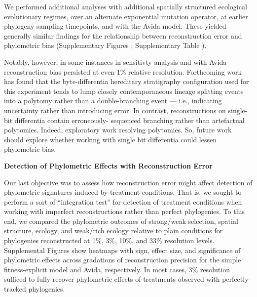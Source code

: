 We performed additional analyses with additional spatially structured ecological evolutionary regimes, over an alternate exponential mutation operator, at earlier phylogeny sampling timepoints, and with the Avida model.
These yielded generally similar findings for the relationship between reconstruction error and phylometric bias (Supplementary Figures ; Supplementary Table ).

Notably, however, in some instances in sensitivty analysis and with Avida reconstruction bias persisted at even 1\% relative resolution.
Forthcoming work has found that the byte-differentia  hereditary stratigraphy configuration used for this experiment tends to lump closely contemporaneous lineage splitting events into a polytomy rather than a double-branching event --- i.e., indicating uncertainty rather than introducing error.
In contrast, reconstructions on single-bit differentia contain erroneously- sequenced branching rather than artefactual polytomies.
Indeed, exploratory work resolving polytomies.
So, future work should explore whether working with single bit differentia could lessen phylometric bias.

\textbf{Detection of Phylometric Effects with Reconstruction Error}

Our last objective was to assess how reconstruction error might affect detection of phylometric signatures induced by treatment conditions.
That is, we sought to perform a sort of ``integration test'' for detection of treatment conditions when working with imperfect reconstructions rather than perfect phylogenies.
To this end, we compared the phylometric outcomes of strong/weak selection, spatial structure, ecology, and weak/rich ecology relative to plain conditions for phylogenies reconstructed at 1\%, 3\%, 10\%, and 33\% resolution levels.
Supplemental Figures  show heatmaps with sign, effect size, and significance of phylometric effects across gradations of reconstruction precision for the simple fitness-explicit model and Avida, respectively.
In most cases, 3\% resolution sufficed to fully recover phylometric effects of treatments observed with perfectly-tracked phylogenies.
